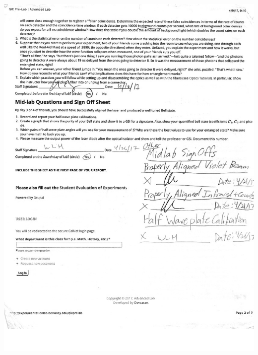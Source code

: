 \documentclass{article}
\begin{document}
\begin{center}
\includegraphics[scale = 0.3]{PreLab2.jpeg}
\end{center}

\newpage
\end{document}
